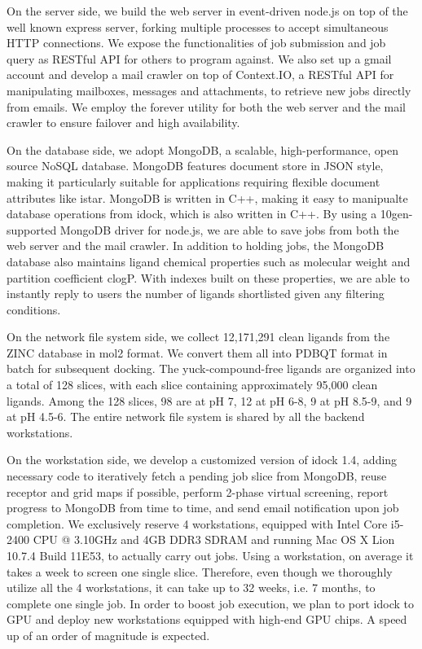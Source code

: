 On the server side, we build the web server in event-driven node.js on top of the well known express server, forking multiple processes to accept simultaneous HTTP connections. We expose the functionalities of job submission and job query as RESTful API for others to program against. We also set up a gmail account and develop a mail crawler on top of Context.IO, a RESTful API for manipulating mailboxes, messages and attachments, to retrieve new jobs directly from emails. We employ the forever utility for both the web server and the mail crawler to ensure failover and high availability.

On the database side, we adopt MongoDB, a scalable, high-performance, open source NoSQL database. MongoDB features document store in JSON style, making it particularly suitable for applications requiring flexible document attributes like istar. MongoDB is written in C++, making it easy to manipualte database operations from idock, which is also written in C++. By using a 10gen-supported MongoDB driver for node.js, we are able to save jobs from both the web server and the mail crawler. In addition to holding jobs, the MongoDB database also maintains ligand chemical properties such as molecular weight and partition coefficient clogP. With indexes built on these properties, we are able to instantly reply to users the number of ligands shortlisted given any filtering conditions.

On the network file system side, we collect 12,171,291 clean ligands from the ZINC database \citep{532} in mol2 format. We convert them all into PDBQT format in batch for subsequent docking. The yuck-compound-free ligands are organized into a total of 128 slices, with each slice containing approximately 95,000 clean ligands. Among the 128 slices, 98 are at pH 7, 12 at pH 6-8, 9 at pH 8.5-9, and 9 at pH 4.5-6. The entire network file system is shared by all the backend workstations.

On the workstation side, we develop a customized version of idock 1.4, adding necessary code to iteratively fetch a pending job slice from MongoDB, reuse receptor and grid maps if possible, perform 2-phase virtual screening, report progress to MongoDB from time to time, and send email notification upon job completion. We exclusively reserve 4 workstations, equipped with Intel Core i5-2400 CPU @ 3.10GHz and 4GB DDR3 SDRAM and running Mac OS X Lion 10.7.4 Build 11E53, to actually carry out jobs. Using a workstation, on average it takes a week to screen one single slice. Therefore, even though we thoroughly utilize all the 4 workstations, it can take up to 32 weeks, i.e. 7 months, to complete one single job. In order to boost job execution, we plan to port idock to GPU and deploy new workstations equipped with high-end GPU chips. A speed up of an order of magnitude is expected.

